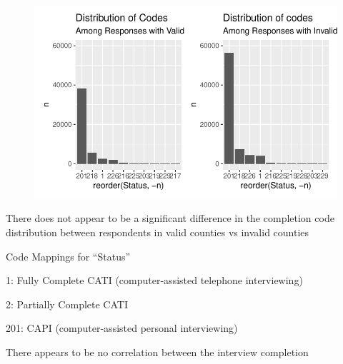 \documentclass[
  letterpaper,
  DIV=11,
  numbers=noendperiod]{scrartcl}
\begin{document}
\begin{figure}[H]

{\centering \includegraphics{GeospatialMapping_files/figure-pdf/looking-into-missing-county-data-1.pdf}

}

\end{figure}

There does not appear to be a significant difference in the completion
code distribution between respondents in valid counties vs invalid
counties

Code Mappings for ``Status''

1: Fully Complete CATI (computer-assisted telephone interviewing)

2: Partially Complete CATI

201: CAPI (computer-assisted personal interviewing)

There appears to be no correlation between the interview completion
\end{document}
